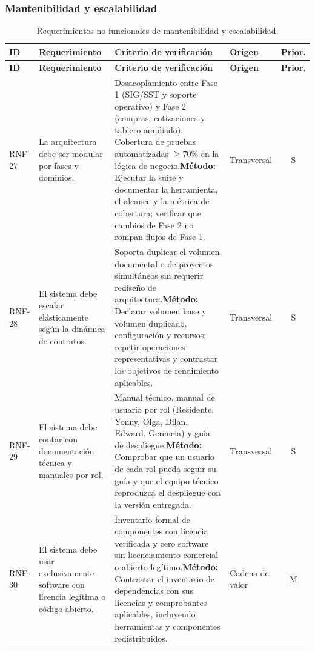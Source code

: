 \documentclass[12pt,letterpaper]{article}
\begin{document}
\subsubsection{Mantenibilidad y escalabilidad}

{\small
\begin{longtable}{@{}L{1.8cm} L{4.65cm} L{4.75cm} L{2.1cm} c@{}}
\caption{Requerimientos no funcionales de mantenibilidad y escalabilidad.}\\
\toprule{}
\textbf{ID} & \textbf{Requerimiento} & \textbf{Criterio de verificación} & \textbf{Origen} & \textbf{Prior.} \\
\midrule
\endfirsthead
\toprule{}
\textbf{ID} & \textbf{Requerimiento} & \textbf{Criterio de verificación} & \textbf{Origen} & \textbf{Prior.} \\
\midrule
\endhead
\bottomrule
\endfoot
RNF-27 & La arquitectura debe ser modular por fases y dominios. & Desacoplamiento entre Fase 1 (SIG/SST y soporte operativo) y Fase 2 (compras, cotizaciones y tablero ampliado). Cobertura de pruebas automatizadas $\ge 70\%$ en la lógica de negocio.\newline \textbf{Método:} Ejecutar la suite y documentar la herramienta, el alcance y la métrica de cobertura; verificar que cambios de Fase 2 no rompan flujos de Fase 1. & Transversal & S \\
RNF-28 & El sistema debe escalar elásticamente según la dinámica de contratos. & Soporta duplicar el volumen documental o de proyectos simultáneos sin requerir rediseño de arquitectura.\newline \textbf{Método:} Declarar volumen base y volumen duplicado, configuración y recursos; repetir operaciones representativas y contrastar los objetivos de rendimiento aplicables. & Transversal & S \\
RNF-29 & El sistema debe contar con documentación técnica y manuales por rol. & Manual técnico, manual de usuario por rol (Residente, Yonny, Olga, Dilan, Edward, Gerencia) y guía de despliegue.\newline \textbf{Método:} Comprobar que un usuario de cada rol pueda seguir su guía y que el equipo técnico reproduzca el despliegue con la versión entregada. & Transversal & S \\
RNF-30 & El sistema debe usar exclusivamente software con licencia legítima o código abierto. & Inventario formal de componentes con licencia verificada y cero software sin licenciamiento comercial o abierto legítimo.\newline \textbf{Método:} Contrastar el inventario de dependencias con sus licencias y comprobantes aplicables, incluyendo herramientas y componentes redistribuidos. & Cadena de valor & M \\
\end{longtable}
}
\end{document}

